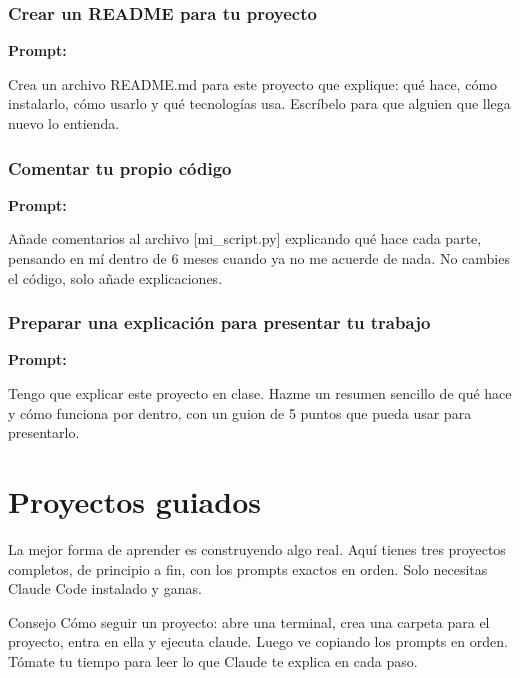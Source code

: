 \documentclass[11pt,a4paper]{report}
\begin{document}
\subsection{Crear un README para tu proyecto}

\noindent\textbf{Prompt: }
\begin{codebox}
Crea un archivo README.md para este proyecto que explique: qué hace, cómo instalarlo, cómo usarlo y qué tecnologías usa. Escríbelo para que alguien que llega nuevo lo entienda.
\end{codebox}

\subsection{Comentar tu propio código}

\noindent\textbf{Prompt: }
\begin{codebox}
Añade comentarios al archivo [mi_script.py] explicando qué hace cada parte, pensando en mí dentro de 6 meses cuando ya no me acuerde de nada. No cambies el código, solo añade explicaciones.
\end{codebox}

\subsection{Preparar una explicación para presentar tu trabajo}

\noindent\textbf{Prompt: }
\begin{codebox}
Tengo que explicar este proyecto en clase. Hazme un resumen sencillo de qué hace y cómo funciona por dentro, con un guion de 5 puntos que pueda usar para presentarlo.
\end{codebox}


\chapter{Proyectos guiados}

La mejor forma de aprender es construyendo algo real. Aquí tienes tres proyectos completos, de principio a fin, con los prompts exactos en orden. Solo necesitas Claude Code instalado y ganas.

\begin{calloutbox}{Consejo}
Cómo seguir un proyecto: abre una terminal, crea una carpeta para el proyecto, entra en ella y ejecuta claude. Luego ve copiando los prompts en orden. Tómate tu tiempo para leer lo que Claude te explica en cada paso.\end{calloutbox}
\end{document}
